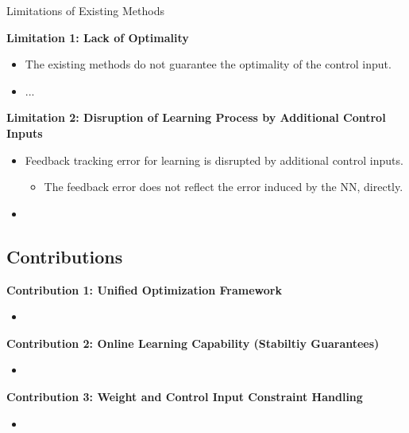 \documentclass[8pt, aspectratio=169, handout]{beamer}
\begin{document}
\begin{frame}{\insertsubsectionhead}{Limitations of Existing Methods}

  \textbf{Limitation 1: Lack of Optimality}
  \begin{itemize}
    \item The existing methods do not guarantee the optimality of the control input.
    \item ...
  \end{itemize}

  \textbf{Limitation 2: Disruption of Learning Process by Additional Control Inputs}
  \begin{itemize}
    \item Feedback tracking error for learning is disrupted by additional control inputs.
      \begin{itemize}
        \item The feedback error does not reflect the error induced by the NN, directly.
      \end{itemize}  
    \item 
  \end{itemize}

\end{frame}

\subsection{Contributions}

\begin{frame}{\insertsubsectionhead}

  \textbf{Contribution 1: Unified Optimization Framework} 
  \begin{itemize}
    \item 
  \end{itemize}

  \textbf{Contribution 2: Online Learning Capability (Stabiltiy Guarantees)}
  \begin{itemize}
    \item 
  \end{itemize}

  \textbf{Contribution 3: Weight and Control Input Constraint Handling}
  \begin{itemize}
    \item 
  \end{itemize}

\end{frame}

\end{document}
